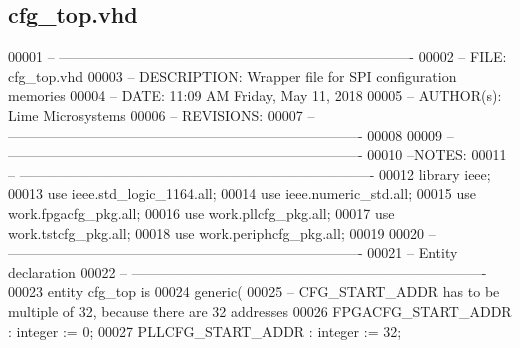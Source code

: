\subsection{cfg\+\_\+top.\+vhd}
\label{cfg__top_8vhd_source}

\begin{DoxyCode}
00001 \textcolor{keyword}{-- ----------------------------------------------------------------------------}
00002 \textcolor{keyword}{-- FILE:          cfg\_top.vhd}
00003 \textcolor{keyword}{-- DESCRIPTION:   Wrapper file for SPI configuration memories}
00004 \textcolor{keyword}{-- DATE:          11:09 AM Friday, May 11, 2018}
00005 \textcolor{keyword}{-- AUTHOR(s):     Lime Microsystems}
00006 \textcolor{keyword}{-- REVISIONS:}
00007 \textcolor{keyword}{-- ----------------------------------------------------------------------------}
00008 
00009 \textcolor{keyword}{-- ----------------------------------------------------------------------------}
00010 \textcolor{keyword}{--NOTES:}
00011 \textcolor{keyword}{-- ----------------------------------------------------------------------------}
00012 \textcolor{vhdlkeyword}{library }\textcolor{keywordflow}{ieee};
00013 \textcolor{vhdlkeyword}{use }ieee.std\_logic\_1164.\textcolor{keywordflow}{all};
00014 \textcolor{vhdlkeyword}{use }ieee.numeric\_std.\textcolor{keywordflow}{all};
00015 \textcolor{vhdlkeyword}{use }work.fpgacfg_pkg.\textcolor{keywordflow}{all};
00016 \textcolor{vhdlkeyword}{use }work.pllcfg_pkg.\textcolor{keywordflow}{all};
00017 \textcolor{vhdlkeyword}{use }work.tstcfg_pkg.\textcolor{keywordflow}{all};
00018 \textcolor{vhdlkeyword}{use }work.periphcfg_pkg.\textcolor{keywordflow}{all};
00019 
00020 \textcolor{keyword}{-- ----------------------------------------------------------------------------}
00021 \textcolor{keyword}{-- Entity declaration}
00022 \textcolor{keyword}{-- ----------------------------------------------------------------------------}
00023 \textcolor{keywordflow}{entity }cfg_top \textcolor{keywordflow}{is}
00024    \textcolor{keywordflow}{generic}\textcolor{vhdlchar}{(}
00025 \textcolor{keyword}{      -- CFG\_START\_ADDR has to be multiple of 32, because there are 32 addresses}
00026       \textcolor{vhdlchar}{FPGACFG_START_ADDR}   \textcolor{vhdlchar}{:} \textcolor{comment}{integer} \textcolor{vhdlchar}{:=} \textcolor{vhdllogic}{}\textcolor{vhdllogic}{0};
00027       \textcolor{vhdlchar}{PLLCFG_START_ADDR}    \textcolor{vhdlchar}{:} \textcolor{comment}{integer} \textcolor{vhdlchar}{:=} \textcolor{vhdllogic}{}\textcolor{vhdllogic}{32};

\end{DoxyCode}
